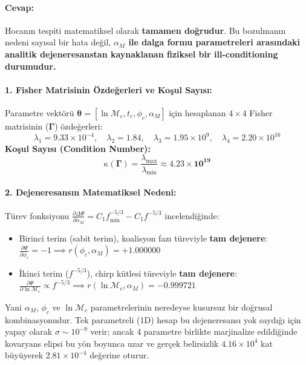 \documentclass[11pt,a4paper]{article}
\begin{document}
\paragraph{Cevap:}
Hocanın tespiti matematiksel olarak \textbf{tamamen doğrudur}. Bu bozulmanın nedeni sayısal bir hata değil, \textbf{$\alpha_M$ ile dalga formu parametreleri arasındaki analitik dejeneresanstan kaynaklanan fiziksel bir ill-conditioning durumudur.}

\paragraph{1. Fisher Matrisinin Özdeğerleri ve Koşul Sayısı:}
Parametre vektörü $\boldsymbol{\theta} = [\ln \mathcal{M}_c, t_c, \phi_c, \alpha_M]$ için hesaplanan $4\times 4$ Fisher matrisinin ($\boldsymbol{\Gamma}$) özdeğerleri:
\begin{equation}
\lambda_1 = 9.33 \times 10^{-4}, \quad \lambda_2 = 1.84, \quad \lambda_3 = 1.95 \times 10^9, \quad \lambda_4 = 2.20 \times 10^{16}
\end{equation}
\textbf{Koşul Sayısı (Condition Number):}
\begin{equation}
\kappa(\boldsymbol{\Gamma}) = \frac{\lambda_{\max}}{\lambda_{\min}} \approx \mathbf{4.23 \times 10^{19}}
\end{equation}

\paragraph{2. Dejeneresansın Matematiksel Nedeni:}
Türev fonksiyonu $\frac{\partial\Delta\Psi}{\partial\alpha_M} = C_1 f_{\min}^{-5/3} - C_1 f^{-5/3}$ incelendiğinde:
\begin{itemize}
    \item Birinci terim (sabit terim), koalisyon fazı türeviyle \textbf{tam dejenere}: $\frac{\partial\Psi}{\partial\phi_c} = -1 \implies r(\phi_c, \alpha_M) = \mathbf{+1.000000}$
    \item İkinci terim ($f^{-5/3}$), chirp kütlesi türeviyle \textbf{tam dejenere}: $\frac{\partial\Psi}{\partial\ln\mathcal{M}_c} \propto f^{-5/3} \implies r(\ln\mathcal{M}_c, \alpha_M) = \mathbf{-0.999721}$
\end{itemize}
Yani $\alpha_M$, $\phi_c$ ve $\ln\mathcal{M}_c$ parametrelerinin neredeyse kusursuz bir doğrusal kombinasyonudur. Tek parametreli (1D) hesap bu dejeneresansı yok saydığı için yapay olarak $\sigma \sim 10^{-9}$ verir; ancak 4 parametre birlikte marjinalize edildiğinde kovaryans elipsi bu yön boyunca uzar ve gerçek belirsizlik $4.16 \times 10^4$ kat büyüyerek $2.81 \times 10^{-4}$ değerine oturur.
\end{document}
